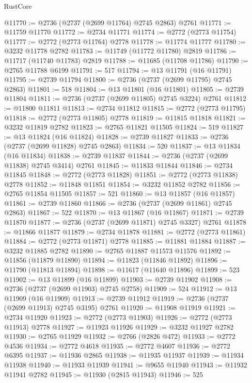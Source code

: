 \begin{lexlean}{RustCore}
\begin{coremodule}
@11770 := @2736 (@2737 (@2699 @11764) @2745 @2863) @2761
@11771 := @11759 @11770
@11772 := @2734 @11771
@11774 := @2772 (@2773 @11754)
@11777 := @2772 (@2773 @11764) @2778
@11778 := @11774 @11777
@11780 := @3232 @11778 @2782
@11783 := @11749 (@11772 @11780) @2819
@11786 := @11717 (@11740 @11783) @2819
@11788 := @11685 (@11708 @11786)
@11790 := @2765 @11788 @6199
@11791 := 517
@11794 := @13 @11791 (@16 @11791)
@11795 := @2739 @11794
@11800 := @2736 (@2737 (@2699 @11795) @2745 @2863)
@11801 := 518
@11804 := @13 @11801 (@16 @11801)
@11805 := @2739 @11804
@11811 := @2736 (@2737 (@2699 @11805) @2745 @3224) @2761
@11812 := @11800 @11811
@11813 := @2734 @11812
@11815 := @2772 (@2773 @11795)
@11818 := @2772 (@2773 @11805) @2778
@11819 := @11815 @11818
@11821 := @3232 @11819 @2782
@11823 := @2765 @11821 @11505
@11824 := 519
@11827 := @13 @11824 (@16 @11824)
@11828 := @2739 @11827
@11833 := @2736 (@2737 (@2699 @11828) @2745 @2863)
@11834 := 520
@11837 := @13 @11834 (@16 @11834)
@11838 := @2739 @11837
@11844 := @2736 (@2737 (@2699 @11838) @2745 @3414) @2761
@11845 := @11833 @11844
@11846 := @2734 @11845
@11848 := @2772 (@2773 @11828)
@11851 := @2772 (@2773 @11838) @2778
@11852 := @11848 @11851
@11854 := @3232 @11852 @2782
@11856 := @2765 @11854 @11505
@11857 := 521
@11860 := @13 @11857 (@16 @11857)
@11861 := @2739 @11860
@11866 := @2736 (@2737 (@2699 @11861) @2745 @2863)
@11867 := 522
@11870 := @13 @11867 (@16 @11867)
@11871 := @2739 @11870
@11877 := @2736 (@2737 (@2699 @11871) @2745 @3327) @2761
@11878 := @11866 @11877
@11879 := @2734 @11878
@11881 := @2772 (@2773 @11861)
@11884 := @2772 (@2773 @11871) @2778
@11885 := @11881 @11884
@11887 := @3232 @11885 @2782
@11890 := @2765 @11887 @11573 @11576
@11892 := @11856 (@11879 @11890)
@11894 := @11823 (@11846 @11892)
@11896 := @11790 (@11813 @11894)
@11898 := @11617 (@11640 @11896)
@11899 := 523
@11902 := @13 @11899 (@16 @11899)
@11903 := @2739 @11902
@11908 := @2736 (@2737 (@2699 @11903) @2745 @2758)
@11909 := 524
@11912 := @13 @11909 (@16 @11909)
@11913 := @2739 @11912
@11919 := @2736 (@2737 (@2699 @11913) @2745 @3195) @2761
@11920 := @11908 @11919
@11921 := @2734 @11920
@11923 := @2772 (@2773 @11903)
@11926 := @2772 (@2773 @11913) @2778
@11927 := @11923 @11926
@11929 := @3232 @11927 @2782
@11930 := @2765 @11929
@11932 := @2766 (@2826 @472)
@11933 := @2772 @4536
@11934 := @2772 @4618
@11935 := @2772 @4607
@11936 := @2772 @6395
@11937 := @11936 @2865
@11938 := @11935 @11937
@11939 := @11934 @11938
@11940 := @11933 @11939
@11941 := @9655 @11940
@11943 := @11932 @11941 @2782
@11945 := @11930 (@2815 @11943)
@11946 := 525

\end{coremodule}
\end{lexlean}
